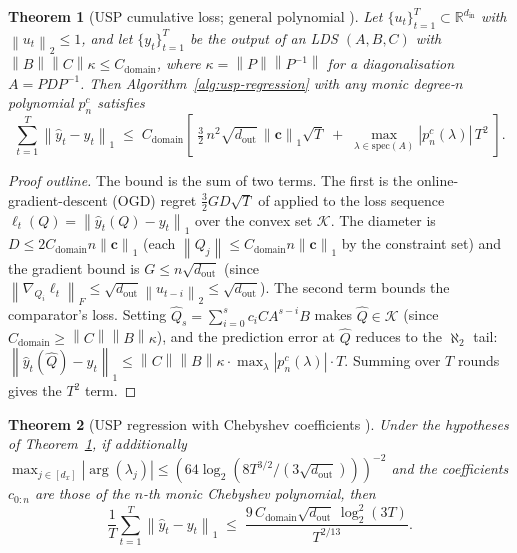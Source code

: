 \documentclass[11pt]{article}
\theoremstyle{plain}
\newtheorem{theorem}{Theorem}[section]
\theoremstyle{definition}
\theoremstyle{remark}
\newcommand{\R}{\mathbb{R}}
\newcommand{\norm}[1]{\left\lVert#1\right\rVert}
\newcommand{\abs}[1]{\left\lvert#1\right\rvert}
\begin{document}
\begin{theorem}[USP cumulative loss; general polynomial {\citep[Thm.~D.1]{marsden2024universal}}]
\label{thm:usp-general}
Let $\{u_t\}_{t=1}^T \subset \R^{d_{\mathrm{in}}}$ with $\norm{u_t}_2 \leq 1$, and let $\{y_t\}_{t=1}^T$ be the output of an LDS $(A, B, C)$ with $\norm{B}\norm{C}\kappa \leq C_{\mathrm{domain}}$, where $\kappa = \norm{P}\norm{P^{-1}}$ for a diagonalisation $A = P D P^{-1}$. Then Algorithm~\ref{alg:usp-regression} with any monic degree-$n$ polynomial $p_n^c$ satisfies
\begin{equation}
    \sum_{t=1}^{T} \norm{\hat y_t - y_t}_1 \;\leq\; C_{\mathrm{domain}} \!\left[\; \tfrac{3}{2}\, n^2 \sqrt{d_{\mathrm{out}}}\, \norm{\boldsymbol{c}}_1 \sqrt{T} \;+\; \max_{\lambda \in \mathrm{spec}(A)} \abs{p_n^c(\lambda)}\, T^2 \;\right].
    \label{eq:usp-regret-general}
\end{equation}
\end{theorem}

\begin{proof}[Proof outline]
The bound is the sum of two terms. The first is the online-gradient-descent (OGD) regret $\frac{3}{2} G D \sqrt{T}$ of \citet[Thm.~6.1]{hazan2025onlinecontrol} applied to the loss sequence $\ell_t(Q) = \norm{\hat y_t(Q) - y_t}_1$ over the convex set $\mathcal{K}$. The diameter is $D \leq 2 C_{\mathrm{domain}} n \norm{\boldsymbol{c}}_1$ (each $\norm{Q_j} \leq C_{\mathrm{domain}} n \norm{\boldsymbol{c}}_1$ by the constraint set) and the gradient bound is $G \leq n \sqrt{d_{\mathrm{out}}}$ (since $\norm{\nabla_{Q_i} \ell_t}_F \leq \sqrt{d_{\mathrm{out}}} \norm{u_{t-i}}_2 \leq \sqrt{d_{\mathrm{out}}}$). The second term bounds the comparator's loss. Setting $\hat Q_s = \sum_{i=0}^{s} c_i C A^{s-i} B$ makes $\hat Q \in \mathcal{K}$ (since $C_{\mathrm{domain}} \geq \norm{C}\norm{B}\kappa$), and the prediction error at $\hat Q$ reduces to the $\aleph_2$ tail: $\norm{\hat y_t(\hat Q) - y_t}_1 \leq \norm{C}\norm{B}\kappa \cdot \max_\lambda \abs{p_n^c(\lambda)} \cdot T$. Summing over $T$ rounds gives the $T^2$ term.
\end{proof}


\begin{theorem}[USP regression with Chebyshev coefficients {\citep[Thm.~2.1]{marsden2024universal}}]
\label{thm:usp-chebyshev}
Under the hypotheses of Theorem~\ref{thm:usp-general}, if additionally $\max_{j \in [d_x]} \abs{\arg(\lambda_j)} \leq (64 \log_2(8T^{3/2}/(3\sqrt{d_{\mathrm{out}}})))^{-2}$ and the coefficients $c_{0:n}$ are those of the $n$-th monic Chebyshev polynomial, then
\[
    \frac{1}{T} \sum_{t=1}^{T} \norm{\hat y_t - y_t}_1 \;\leq\; \frac{9\, C_{\mathrm{domain}} \sqrt{d_{\mathrm{out}}}\, \log_2^2(3T)}{T^{2/13}}.
\]
\end{theorem}
\end{document}
